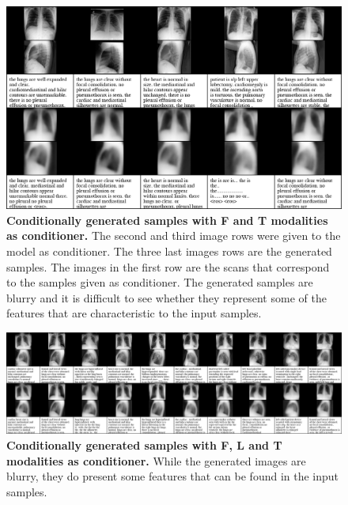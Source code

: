 \begin{figure}
    \centering
    \includegraphics[width=\textwidth]{data/cond_gen/Lateral_text}
    \caption{
        \textbf{Conditionally generated samples with F and T modalities as conditioner.} The second and third image rows were given to the model as conditioner. The three last images rows are the generated samples. The images in the first row are the scans that correspond to the samples given as conditioner. The generated samples are blurry and it is difficult to see whether they represent some of the features that are characteristic to the input samples.
    }
    \label{fig:fig_cond_lattext}
\end{figure}

\begin{figure}
    \centering
    \includegraphics[width=\textwidth]{data/cond_gen/Lateral_PA_text}
    \caption{
        \textbf{Conditionally generated samples with F, L and T modalities as conditioner.} While the generated images are blurry, they do present some features that can be found in the input samples.
    }
    \label{fig:fig_cond_latPAtext}
\end{figure}


